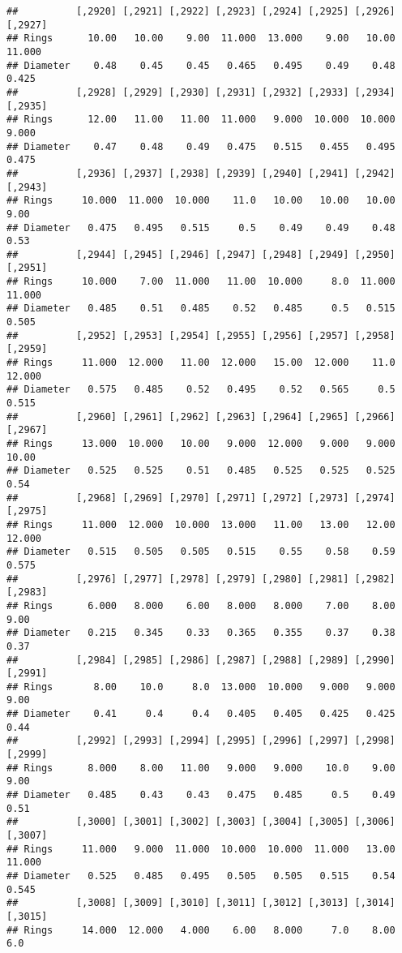 \documentclass[
]{article}
\begin{document}
\begin{verbatim}
##          [,2920] [,2921] [,2922] [,2923] [,2924] [,2925] [,2926] [,2927]
## Rings      10.00   10.00    9.00  11.000  13.000    9.00   10.00  11.000
## Diameter    0.48    0.45    0.45   0.465   0.495    0.49    0.48   0.425
##          [,2928] [,2929] [,2930] [,2931] [,2932] [,2933] [,2934] [,2935]
## Rings      12.00   11.00   11.00  11.000   9.000  10.000  10.000   9.000
## Diameter    0.47    0.48    0.49   0.475   0.515   0.455   0.495   0.475
##          [,2936] [,2937] [,2938] [,2939] [,2940] [,2941] [,2942] [,2943]
## Rings     10.000  11.000  10.000    11.0   10.00   10.00   10.00    9.00
## Diameter   0.475   0.495   0.515     0.5    0.49    0.49    0.48    0.53
##          [,2944] [,2945] [,2946] [,2947] [,2948] [,2949] [,2950] [,2951]
## Rings     10.000    7.00  11.000   11.00  10.000     8.0  11.000  11.000
## Diameter   0.485    0.51   0.485    0.52   0.485     0.5   0.515   0.505
##          [,2952] [,2953] [,2954] [,2955] [,2956] [,2957] [,2958] [,2959]
## Rings     11.000  12.000   11.00  12.000   15.00  12.000    11.0  12.000
## Diameter   0.575   0.485    0.52   0.495    0.52   0.565     0.5   0.515
##          [,2960] [,2961] [,2962] [,2963] [,2964] [,2965] [,2966] [,2967]
## Rings     13.000  10.000   10.00   9.000  12.000   9.000   9.000   10.00
## Diameter   0.525   0.525    0.51   0.485   0.525   0.525   0.525    0.54
##          [,2968] [,2969] [,2970] [,2971] [,2972] [,2973] [,2974] [,2975]
## Rings     11.000  12.000  10.000  13.000   11.00   13.00   12.00  12.000
## Diameter   0.515   0.505   0.505   0.515    0.55    0.58    0.59   0.575
##          [,2976] [,2977] [,2978] [,2979] [,2980] [,2981] [,2982] [,2983]
## Rings      6.000   8.000    6.00   8.000   8.000    7.00    8.00    9.00
## Diameter   0.215   0.345    0.33   0.365   0.355    0.37    0.38    0.37
##          [,2984] [,2985] [,2986] [,2987] [,2988] [,2989] [,2990] [,2991]
## Rings       8.00    10.0     8.0  13.000  10.000   9.000   9.000    9.00
## Diameter    0.41     0.4     0.4   0.405   0.405   0.425   0.425    0.44
##          [,2992] [,2993] [,2994] [,2995] [,2996] [,2997] [,2998] [,2999]
## Rings      8.000    8.00   11.00   9.000   9.000    10.0    9.00    9.00
## Diameter   0.485    0.43    0.43   0.475   0.485     0.5    0.49    0.51
##          [,3000] [,3001] [,3002] [,3003] [,3004] [,3005] [,3006] [,3007]
## Rings     11.000   9.000  11.000  10.000  10.000  11.000   13.00  11.000
## Diameter   0.525   0.485   0.495   0.505   0.505   0.515    0.54   0.545
##          [,3008] [,3009] [,3010] [,3011] [,3012] [,3013] [,3014] [,3015]
## Rings     14.000  12.000   4.000    6.00   8.000     7.0    8.00     6.0

\end{verbatim}
\end{document}
